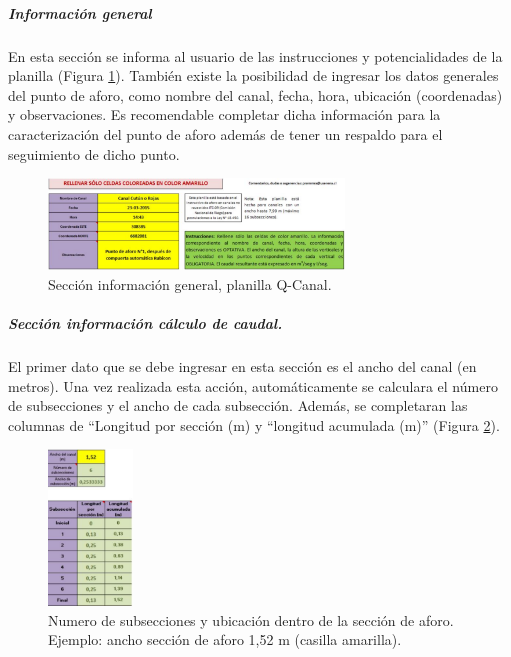 \documentclass[]{article}
\begin{document}
\subparagraph{Información general}
En esta sección se informa al usuario de las instrucciones y potencialidades de la planilla (Figura \ref{info_general}). También existe la posibilidad de ingresar los datos generales del punto de aforo, como nombre del canal, fecha, hora, ubicación (coordenadas) y observaciones. Es recomendable completar dicha información para la caracterización del punto de aforo además de tener un respaldo para el seguimiento de dicho punto.

\begin{figure}[h]
\centering
\includegraphics[width=0.7\textwidth]{images/info_general.eps}
\caption{Sección información general, planilla Q-Canal.}
\label{info_general}
\end{figure}

\subparagraph{Sección información cálculo de caudal.}
El primer dato que se debe ingresar en esta sección es el ancho del canal (en metros). Una vez realizada esta acción, automáticamente se calculara el número de subsecciones y el ancho de cada subsección. Además, se completaran las columnas de “Longitud por sección (m) y “longitud acumulada (m)” (Figura \ref{casilla}).

\begin{figure}[h]
\centering
\includegraphics[width=0.2\textwidth]{images/n_subsecciones.eps}
\caption{Numero de subsecciones y ubicación dentro de la sección de aforo. Ejemplo: ancho sección de aforo 1,52 m (casilla amarilla).}
\label{casilla}
\end{figure}
\end{document}
